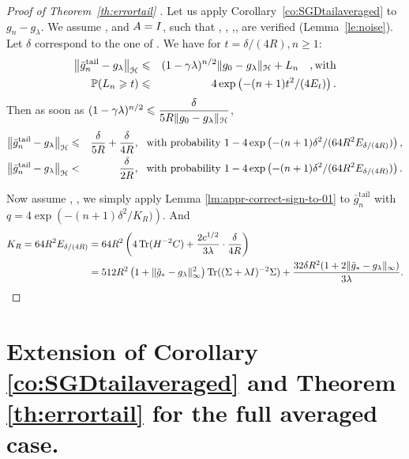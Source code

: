 \begin{proof}[Proof of Theorem~\ref{th:errortail} ]

Let us apply Corollary~\ref{co:SGDtailaveraged} to $g_n - g_\lambda$. We assume ,  and $A = I$, such that , , ,,  are verified (Lemma~\ref{le:noise}). Let $\delta$ correspond to the one of .
 We have for $t = \delta/(4R), n \geqslant 1$:   
\begin{eqnarray*}
\left\|\bar{g}_n^{\textrm {tail}} - g_\lambda \right\|_{\mathcal H} &\leqslant& (1-\gamma\lambda)^{n/2}  \|g_0- g_\lambda\|_{\mathcal H} + L_n \quad,\text{with} \\
 {\mathbb P}(L_n \geqslant t ) &\leqslant& 4\exp\left( - (n+1)t^2/(4E_t)\right).
\end{eqnarray*}
Then as soon as $(1-\gamma\lambda)^{n/2} \leqslant \displaystyle \frac{\delta} {5R\|g_0- g_\lambda\|_{\mathcal H}}$, 
\begin{eqnarray*}
\left\|\bar{g}_n^{\textrm {tail}} - g_\lambda \right\|_{\mathcal H} &\leqslant& \frac{\delta}{5R} + \frac{\delta}{4R},\ \text{ with probability } 1-4\exp\left( - (n+1)\delta^2/(64 R^2E_{\delta/(4R)})\right), \\
\left\|\bar{g}_n^{\textrm {tail}} - g_\lambda \right\|_{\mathcal H} &<& \frac{\delta}{2R},\ \text{ with probability } 1-4\exp\left( - (n+1)\delta^2/(64 R^2E_{\delta/(4R)})\right).
\end{eqnarray*}

Now assume , , we simply apply Lemma \ref{lm:appr-correct-sign-to-01} to $\bar{g}_n^{\textrm {tail}}$ with $q = 4\exp\left( - (n+1)\delta^2/K_R)\right)$. And 
\begin{align*}
K_R = 64 R^2E_{\delta/(4R)} &=  64 R^2 \left(4\operatorname{Tr}(H^{-2}C)+\frac{2c^{1/2}}{3\lambda}\cdot \frac{\delta}{4R}\right)  \\
 &= 512 R ^2  \left(1+\|\tilde{g}_*- g_\lambda\|^2_\infty\right)\operatorname{Tr}((\Sigma + \lambda I)^{-2}\Sigma)+\frac{32 \delta R^2 ( 1 + 2 \| \tilde{g}_* - g_\lambda\|_\infty )}{3\lambda} .
\end{align*}

\end{proof}

\section{Extension of Corollary \ref{co:SGDtailaveraged} and Theorem \ref{th:errortail} for the full averaged case.}
\label{ap:average}

